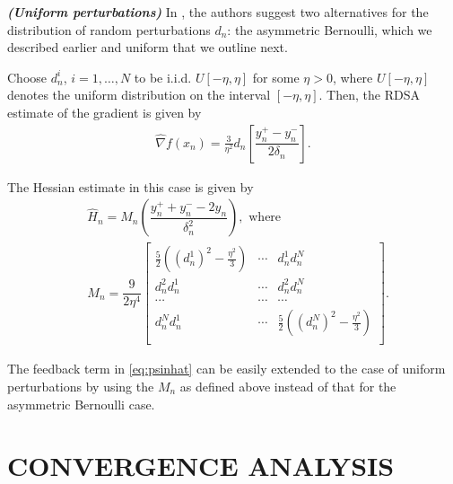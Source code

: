 \documentclass[letterpaper, 10 pt, conference]{ieeeconf}  %
\begin{document}
\begin{remark}\textbf{\textit{(Uniform perturbations)}}
\label{remark:unif}
In \cite{prashanth2015rdsa}, the authors suggest two alternatives for the distribution of random perturbations $d_n$: the asymmetric Bernoulli, which we described earlier and uniform that we outline next.

Choose $d_n^i$, $ i=1,\ldots,N$ to be i.i.d. $U[-\eta,\eta]$ for some $\eta>0$, where $U[-\eta,\eta]$ denotes the uniform distribution on the interval $[-\eta,\eta]$.
Then, the RDSA estimate of the gradient is given by
\begin{align}
\label{eq:grad-unif}
\widehat\nabla f(x_n) = \frac3{\eta^2} d_n \left[ \dfrac{y_n^+ - y_n^-}{2\delta_n}\right].
\end{align}

The Hessian estimate in this case is given by
\begin{align}
\label{eq:2rdsa-estimate-unif}
&\widehat H_n =  M_n \left(\dfrac{y_n^+ + y_n^- - 2 y_n}{\delta_n^2}\right), \text{ where } \\
& M_n =
\dfrac{9}{2\eta^4}\left[
\begin{array}{cccc}
\frac{5}{2}\left((d_n^1)^2-\frac{\eta^2}{3}\right) & \cdots & d_n^1 d_n^N\\
d_n^2 d_n^1  &  \cdots & d_n^2 d_n^N\\
\cdots&\cdots&\cdots\\
d_n^N d_n^1 & \cdots &  \frac{5}{2}\left((d_n^N)^2-\frac{\eta^2}{3}\right) \\
\end{array}
\right].\nonumber
\end{align}

The feedback term in \eqref{eq:psinhat} can be easily extended to the case of uniform perturbations by using the $M_n$ as defined above instead of that for the asymmetric Bernoulli case.
\end{remark}


\section{CONVERGENCE ANALYSIS}
\label{sec:2rdsa-results}


\end{document}
